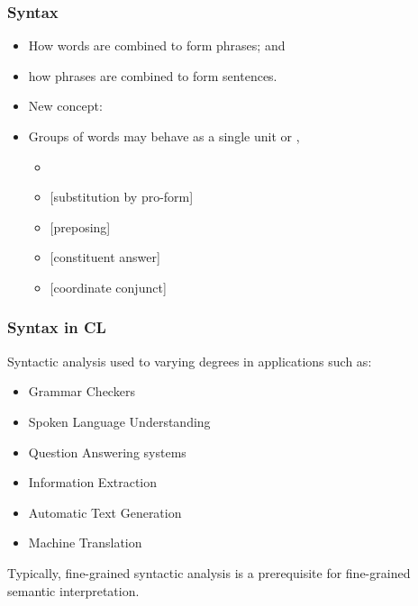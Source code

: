 \begin{frame}[fragile]
\frametitle{Syntax}

\begin{itemize}
\item How words are combined to form phrases; and
\item how phrases are combined to form sentences.
\end{itemize}

\begin{itemize}
\item New concept:  
\item Groups of words may behave as a single unit or ,

\begin{itemize}
\item {}
\item {} [substitution by pro-form]
\item {} [preposing]
\item {} [constituent answer]
\item {} [coordinate conjunct]
\end{itemize}
\end{itemize}





\end{frame}
\begin{frame}[fragile]
\frametitle{Syntax in CL}

Syntactic analysis used to varying degrees in applications such as:
\begin{itemize}
\item Grammar Checkers
\item Spoken Language Understanding
\item Question Answering systems
\item Information Extraction 
\item Automatic Text Generation 
\item Machine Translation
\end{itemize}
Typically, fine-grained syntactic analysis is a prerequisite for
fine-grained semantic interpretation.
\end{frame}

